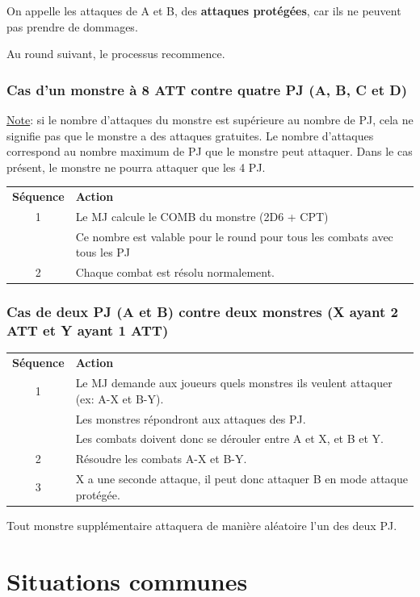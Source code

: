 \documentclass[a4paper, 11pt, twoside]{article}
\begin{document}
On appelle les attaques de A et B, des \textbf{attaques protégées}, car ils ne peuvent pas prendre de dommages.

Au round suivant, le processus recommence.

\subsubsection{Cas d'un monstre à 8 ATT contre quatre PJ (A, B, C et D)}
\label{sec:org07cf8f9}

\uline{Note}: si le nombre d'attaques du monstre est supérieure au nombre de PJ, cela ne signifie pas que le monstre a des attaques gratuites. Le nombre d'attaques correspond au nombre maximum de PJ que le monstre peut attaquer. Dans le cas présent, le monstre ne pourra attaquer que les 4 PJ.

\begin{longtable}{cl}
\textbf{Séquence} & \textbf{Action}\\
1 & Le MJ calcule le COMB du monstre (2D6 + CPT)\\
 & Ce nombre  est valable pour le round pour tous les combats avec tous les PJ\\
2 & Chaque combat est résolu normalement.\\
\end{longtable}


\subsubsection{Cas de deux PJ (A et B) contre deux monstres (X ayant 2 ATT et Y ayant 1 ATT)}
\label{sec:org38d9123}

\begin{longtable}{cl}
\textbf{Séquence} & \textbf{Action}\\
1 & Le MJ demande aux joueurs quels monstres ils veulent attaquer (ex: A-X et B-Y).\\
 & Les monstres répondront aux attaques des PJ.\\
 & Les combats doivent donc se dérouler entre A et X, et B et Y.\\
2 & Résoudre les combats A-X et B-Y.\\
3 & X a une seconde attaque, il peut donc attaquer B en mode attaque protégée.\\
\end{longtable}

Tout monstre supplémentaire attaquera de manière aléatoire l'un des deux PJ.

\section{Situations communes}
\label{sec:org0c0da5e}
\end{document}
